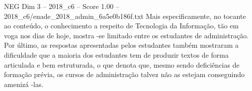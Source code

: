 \begin{textsample}{NEG Dim 3 – 2018\_c6 – Score 1.00 – 2018\_c6/enade\_2018\_admin\_6a5e0b186f.txt}
Mais especificamente, no tocante ao conteúdo, o conhecimento a respeito de Tecnologia da Informação, tão em voga nos dias de hoje, mostra -se limitado entre os estudantes de administração.
Por último, as respostas apresentadas pelos estudantes também mostraram a dificuldade que a maioria dos estudantes tem de produzir textos de forma articulada e bem estruturada, o que denota que, mesmo sendo deficiências de formação prévia, os cursos de administração talvez não as estejam conseguindo amenizá -las.

\end{textsample}
